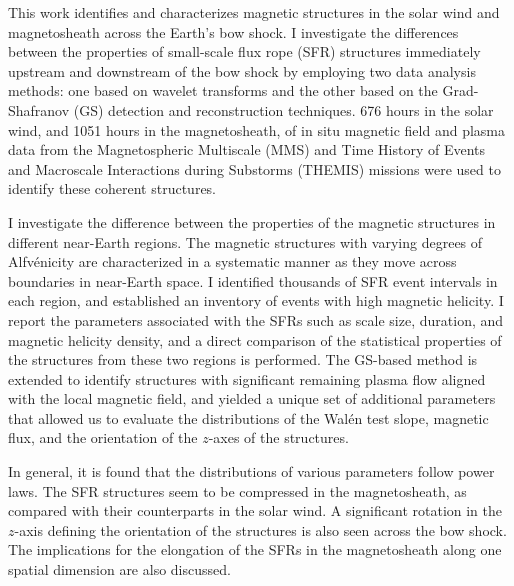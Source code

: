 
This work identifies and characterizes magnetic structures in the solar wind and magnetosheath across the Earth's bow shock. I investigate the differences between the properties of small-scale flux rope (SFR) structures immediately upstream and downstream of the bow shock by employing two data analysis methods: one based on wavelet transforms and the other based on the Grad-Shafranov (GS) detection and reconstruction techniques. 676 hours in the solar wind, and 1051 hours in the magnetosheath, of in situ magnetic field and plasma data from the Magnetospheric Multiscale (MMS) and Time History of Events and Macroscale Interactions during Substorms (THEMIS) missions were used to identify these coherent structures.

I investigate the difference between the properties of the magnetic structures in different near-Earth regions. The magnetic structures with varying degrees of Alfv\'enicity are characterized in a systematic manner as they move across boundaries in near-Earth space. I identified thousands of SFR event intervals in each region, and established an inventory of events with high magnetic helicity. I report the parameters associated with the SFRs such as scale size, duration, and magnetic helicity density, and a direct comparison of the statistical properties of the structures from these two regions is performed. The GS-based method is extended to identify structures with significant remaining plasma flow aligned with the local magnetic field, and yielded a unique set of additional parameters that allowed us to evaluate the distributions of the Wal\'en test slope, magnetic flux, and the orientation of the $z$-axes of the structures.

In general, it is found that the distributions of various parameters follow power laws. The SFR structures seem to be compressed in the magnetosheath, as compared with their counterparts in the solar wind. A significant rotation in the $z$-axis defining the orientation of the structures is also seen across the bow shock. The implications for the elongation of the SFRs in the magnetosheath along one spatial dimension are also discussed. 

\clearpage

